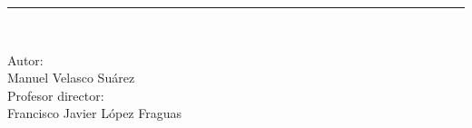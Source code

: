 \documentclass[class=article, crop=false]{standalone}
\begin{document}
\begin{titlepage}
\begin{center}
    \rule{80mm}{0.1mm}\\
    \vspace*{0.2cm}
    
    \begin{large}
      Autor: \\
      Manuel Velasco Suárez \\
      \vspace{0.2cm}
      Profesor director: \\
      Francisco Javier López Fraguas \\
    \end{large}
  \end{center}
  
\end{titlepage}
\end{document}
